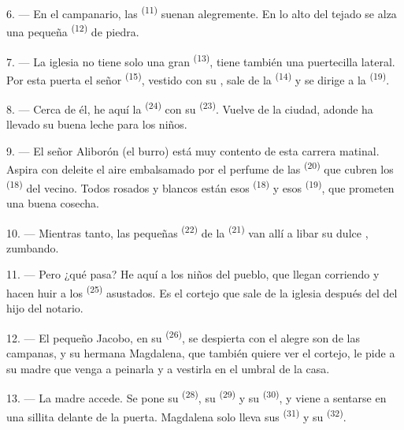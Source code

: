 6. --- En el campanario, las  \textsuperscript{(11)} suenan
alegremente. En lo alto del tejado se alza una pequeña 
\textsuperscript{(12)} de piedra.

7. --- La iglesia no tiene solo una gran  \textsuperscript{(13)},
tiene también una puertecilla lateral. Por esta puerta el señor
 \textsuperscript{(15)}, vestido con su , sale de la
 \textsuperscript{(14)} y se dirige a la 
\textsuperscript{(19)}.

8. --- Cerca de él, he aquí la  \textsuperscript{(24)} con su
 \textsuperscript{(23)}. Vuelve de la ciudad, adonde ha llevado su
buena leche para los niños.

\VUsaut{4.0mm}
\VUsaut{3.4mm}

9. --- El señor Aliborón (el burro) está muy contento de esta carrera
matinal. Aspira con deleite el aire embalsamado por el perfume de las
 \textsuperscript{(20)} que cubren los 
\textsuperscript{(18)} del  vecino. Todos rosados y blancos están
esos  \textsuperscript{(18)} y esos 
\textsuperscript{(19)}, que prometen una buena cosecha.

10. --- Mientras tanto, las pequeñas  \textsuperscript{(22)} de la
 \textsuperscript{(21)} van allí a libar su dulce ,
zumbando.

11. --- Pero ¿qué pasa? He aquí a los niños del pueblo, que llegan
corriendo y hacen huir a los  \textsuperscript{(25)} asustados. Es el
cortejo que sale de la iglesia después del  del hijo del
notario.

12. --- El pequeño Jacobo, en su  \textsuperscript{(26)}, se despierta
con el alegre son de las campanas, y su hermana Magdalena, que también
quiere ver el cortejo, le pide a su madre que venga a peinarla y a
vestirla en el umbral de la casa.

13. --- La madre accede. Se pone su 
\textsuperscript{(28)}, su  \textsuperscript{(29)} y su 
\textsuperscript{(30)}, y viene a sentarse en una sillita delante de la puerta.
Magdalena solo lleva sus  \textsuperscript{(31)} y su 
\textsuperscript{(32)}.

